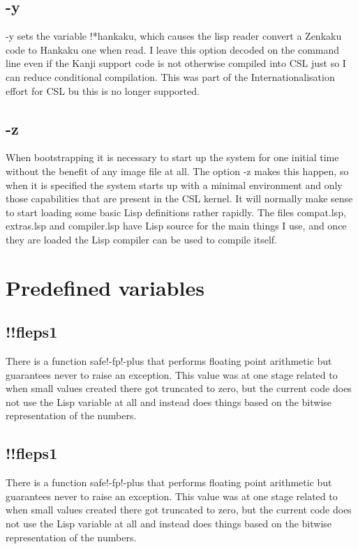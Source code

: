 \documentclass[a4paper,11pt]{article}
\begin{document}
\subsection{\ttfamily -y}
{\ttfamily -y } sets the variable {\ttfamily !*hankaku}, which causes the
lisp reader convert a Zenkaku code to Hankaku one when read. I leave this
option decoded on the command line even if the Kanji support code is not
otherwise compiled into CSL just so I can reduce conditional compilation.
This was part of the Internationalisation effort for CSL bu this is no longer
supported.

\subsection{\ttfamily -z}
When bootstrapping it is necessary to start up the system for one initial time
without the benefit of any image file at all. The option {\ttfamily -z} makes
this happen, so when it is specified the system starts up with a minimal
environment and only those capabilities that are present in the CSL
kernel. It will normally make sense to start loading some basic Lisp
definitions rather rapidly. The files {\ttfamily compat.lsp},
{\ttfamily extras.lsp} and {\ttfamily compiler.lsp} have Lisp source for the
main things I use, and once they are loaded the Lisp compiler can be used
to compile itself.

\section{Predefined variables}

\subsection{\ttfamily !!fleps1}
There is a function safe!-fp!-plus that performs floating point
arithmetic but guarantees never to raise an exception. This value was
at one stage related to when small values created there got truncated to zero,
but the current code does not use the Lisp variable at all and instead does
things based on the bitwise representation of the numbers.

\subsection{\ttfamily !!fleps1}
There is a function safe!-fp!-plus that performs floating point
arithmetic but guarantees never to raise an exception. This value was
at one stage related to when small values created there got truncated to zero,
but the current code does not use the Lisp variable at all and instead does
things based on the bitwise representation of the numbers.
\end{document}
